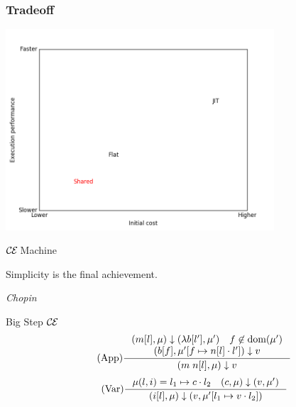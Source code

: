 \documentclass[14pt,mathserif]{beamer}
\def\ce{$\mathcal{\mathcal{C} \mskip -1mu \mathcal{E}} \mskip 4mu$}
\newcommand{\sectionslide}[3]{
  \begin{frame}
  \vspace{1cm}
  \vfill
  {\usebeamerfont{title} \color{red} #1}
  \vfill
  \epigraph{\footnotesize{#2}}{\footnotesize{\emph{#3}}}
  \end{frame}}
\begin{document}
\begin{frame}[fragile]
\frametitle{Tradeoff}
\begin{center}
\includegraphics[width=10cm]{tradeoffplot}
\end{center}
\end{frame}

\sectionslide{\ce Machine}
{Simplicity is the final achievement.}
{Chopin}

\begin{frame}{Big Step \ce} 
\begin{align*}
\tag{App} \inference
{(m[l], \mu) \downarrow (\lambda b[l'], \mu') \quad f \not \in \textnormal{dom}(\mu') \\ 
(b[f], \mu'[f \mapsto n[l] \cdot l']) \downarrow v}
{(m \; n[l], \mu) \downarrow v}  
\end{align*}
\begin{align*}
\tag{Var} \inference
{\mu(l, i) = l_1 \mapsto c \cdot l_2 \quad (c, \mu) \downarrow (v, \mu')}
{(i[l],\mu) \downarrow (v, \mu'[l_1 \mapsto v \cdot l_2])}
\end{align*}
\end{frame}
\end{document}
